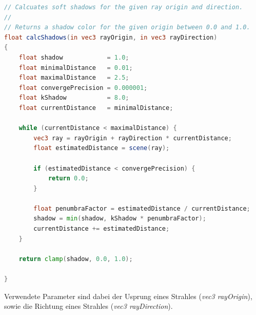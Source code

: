 \begin{lstlisting}[language=GLSL,caption={Funktion zur Berechnung von
        weichen Schatten  in
        GLSL.},label={alg:glsl_soft_shadows},captionpos=b,emph={calcShadows}]
// Calcuates soft shadows for the given ray origin and direction.
//
// Returns a shadow color for the given origin between 0.0 and 1.0.
float calcShadows(in vec3 rayOrigin, in vec3 rayDirection)
{
    float shadow            = 1.0;
    float minimalDistance   = 0.01;
    float maximalDistance   = 2.5;
    float convergePrecision = 0.000001;
    float kShadow           = 8.0;
    float currentDistance   = minimalDistance;

    while (currentDistance < maximalDistance) {
        vec3 ray = rayOrigin + rayDirection * currentDistance;
        float estimatedDistance = scene(ray);

        if (estimatedDistance < convergePrecision) {
            return 0.0;
        }

        float penumbraFactor = estimatedDistance / currentDistance;
        shadow = min(shadow, kShadow * penumbraFactor);
        currentDistance += estimatedDistance;
    }

    return clamp(shadow, 0.0, 1.0);

}
\end{lstlisting}

Verwendete Parameter sind dabei der Usprung eines Strahles
(\textit{vec3 rayOrigin}), sowie die Richtung eines Strahles (\textit{vec3
    rayDirection}). 

